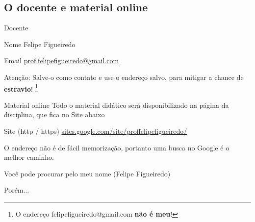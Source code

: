 \documentclass{beamer}
\begin{document}
\subsection{O docente e material online}

\begin{frame}{Docente}
  \begin{block}{Nome}
    Felipe Figueiredo
  \end{block}
  \begin{block}{Email}
    \url{prof.felipefigueiredo@gmail.com}

    \bigskip
    \small
    \alert{Atenção:} Salve-o como contato e use o endereço salvo, para mitigar a chance de {\bf estravio}!
    \footnote{O endereço felipefigueiredo@gmail.com {\bf não é meu}!}
  \end{block}
\end{frame}

\begin{frame}{Material online}
  Todo o material didático será disponibilizado na página da disciplina, que fica no Site abaixo
  \begin{block}{Site (http / https)}
    \small
    \url{sites.google.com/site/proffelipefigueiredo/}
  \end{block}

  \bigskip
  O endereço não é de fácil memorização, portanto uma busca no Google é o melhor caminho.

  \bigskip
  Você pode procurar pelo meu nome (Felipe Figueiredo)

  \bigskip
  \bigskip
  Porém...
\end{frame}
\end{document}
